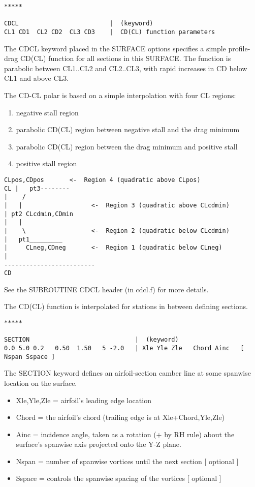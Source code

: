\begin{lstlisting}
*****

CDCL                         |  (keyword)
CL1 CD1  CL2 CD2  CL3 CD3    |  CD(CL) function parameters

\end{lstlisting}

The CDCL keyword placed in the SURFACE options specifies a simple
profile-drag CD(CL) function for all sections in this SURFACE.  
The function is parabolic between CL1..CL2 and 
CL2..CL3, with rapid increases in CD below CL1 and above CL3.

The CD-CL polar is based on a simple interpolation with four CL regions:
\begin{enumerate}
\item negative stall region
\item parabolic CD(CL) region between negative stall and the drag minimum
\item parabolic CD(CL) region between the drag minimum and positive stall
\item positive stall region
\end{enumerate}

\begin{lstlisting}
CLpos,CDpos       <-  Region 4 (quadratic above CLpos)
CL |   pt3--------      
|    /                     
|   |                   <-  Region 3 (quadratic above CLcdmin)
| pt2 CLcdmin,CDmin  
|   |                
|    \                  <-  Region 2 (quadratic below CLcdmin)
|   pt1_________      
|     CLneg,CDneg       <-  Region 1 (quadratic below CLneg)
|                             
-------------------------
CD
\end{lstlisting}
See the SUBROUTINE CDCL header (in cdcl.f) for more details.

The CD(CL) function is interpolated for stations in between
defining sections.  \\

\begin{lstlisting}
*****

SECTION                             |  (keyword)
0.0 5.0 0.2   0.50  1.50   5 -2.0   | Xle Yle Zle   Chord Ainc   [ Nspan Sspace ]

\end{lstlisting}

The SECTION keyword defines an airfoil-section camber line at some 
spanwise location on the surface.
\begin{itemize}
\item Xle,Yle,Zle =  airfoil's leading edge location
\item Chord       =  the airfoil's chord  (trailing edge is at Xle+Chord,Yle,Zle)
\item Ainc        =  incidence angle, taken as a rotation (+ by RH rule) about the surface's spanwise axis projected onto the Y-Z plane.  
\item Nspan       =  number of spanwise vortices until the next section [ optional ]
\item Sspace      =  controls the spanwise spacing of the vortices      [ optional ]

\end{itemize}


